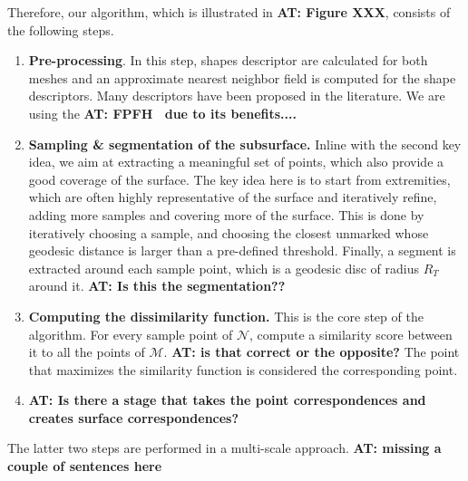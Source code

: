 \documentclass[10pt,twocolumn,letterpaper]{article}
\newcommand{\colornote}[3]{{\color{#1}\bf{#2: #3}\normalfont}}
\newcommand{\colornote}[3]{}
\newcommand {\ayellet}[1]{\colornote{blue}{AT}{#1}}
\begin{document}
Therefore, our algorithm, which is illustrated in \ayellet{Figure XXX}, consists of the following steps.
\begin{enumerate}
    \item 
    \textbf{Pre-processing}.
    In this step, shapes descriptor are calculated for both meshes and an approximate nearest neighbor field is computed for the shape descriptors.
    Many descriptors have been proposed in the literature.
    We are using the \ayellet{ FPFH~\cite{} due to its benefits....}
    \item
    {\bf Sampling \& segmentation of the subsurface.} 
    Inline with the second key idea, we aim at extracting a meaningful set of points, which also provide a good coverage of the surface. 
    The key idea here is to start from extremities, which are often highly representative of the surface and iteratively refine, adding more samples and covering more of the surface.
    This is done by iteratively choosing a sample, and choosing the closest unmarked whose geodesic distance is larger than a pre-defined threshold.
    Finally, a segment is extracted around each sample point, which is a geodesic disc of radius $R_T$ around it.
    \ayellet{Is this the segmentation??}
    \item
    {\bf Computing the dissimilarity function.} 
    This is the core step of the algorithm.
    For every sample point of  $\mathcal{N}$, 
    compute a similarity score between it to all the points of  $\mathcal{M}$.
    \ayellet{is that correct or the opposite?}
    The point that maximizes the similarity function is considered the corresponding point.
    \item
    \ayellet{Is there a stage that takes the point correspondences and creates surface correspondences?}
\end{enumerate}
The latter two steps are performed in a multi-scale approach.
\ayellet{missing a couple of sentences here}
\end{document}
